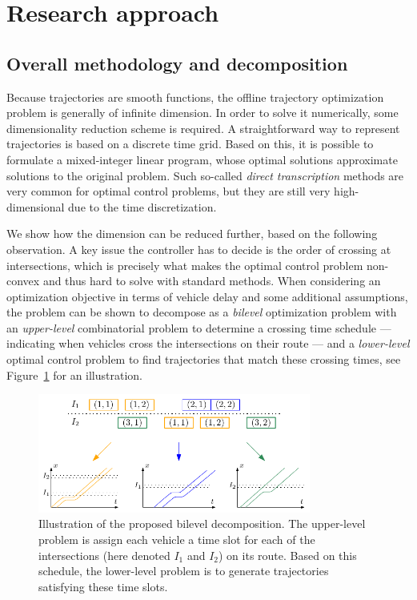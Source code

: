 \documentclass{article}
\theoremstyle{definition}
\theoremstyle{plain}
\begin{document}
\newpage

\section{Research approach}

\subsection{Overall methodology and decomposition}

Because trajectories are smooth functions, the offline trajectory optimization
problem is generally of infinite dimension. In order to solve it numerically,
some dimensionality reduction scheme is required. A straightforward way to
represent trajectories is based on a discrete time grid. Based on this, it is
possible to formulate a mixed-integer linear program, whose optimal solutions
approximate solutions to the original problem. Such so-called \textit{direct
  transcription} methods are very common for optimal control problems, but they
are still very high-dimensional due to the time discretization.

We show how the dimension can be reduced further, based on the following
observation. A key issue the controller has to decide is the order of crossing
at intersections, which is precisely what makes the optimal control problem
non-convex and thus hard to solve with standard methods. When considering an
optimization objective in terms of vehicle delay and some additional
assumptions, the problem can be shown to decompose as a \textit{bilevel} optimization
problem with an \textit{upper-level} combinatorial problem to determine a crossing time
schedule --- indicating when vehicles cross the intersections on their route
--- and a \textit{lower-level} optimal control problem to find trajectories that match
these crossing times, see Figure~\ref{fig:network_bilevel} for an illustration.

\begin{figure}[h]
  \centering
  \includegraphics[width=0.8\textwidth]{figures/network_bilevel.pdf}
  \caption{Illustration of the proposed bilevel decomposition. The upper-level
    problem is assign each vehicle a time slot for each of the intersections
    (here denoted $I_{1}$ and $I_{2}$) on its route. Based on this schedule, the
    lower-level problem is to generate trajectories satisfying these time
    slots.}
  \label{fig:network_bilevel}
\end{figure}
\end{document}
